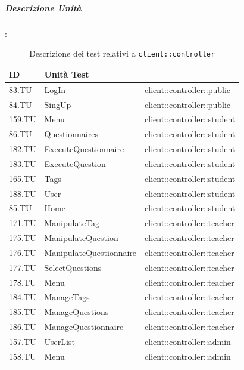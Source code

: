 \documentclass[12pt,a4paper]{article}
\begin{document}
\newpage
\subparagraph{Descrizione Unità}:
\begin{table}[H]
	\begin{center}
		\begin{tabular}{p{} p{} p{}}
			\toprule
			\textbf{ID}   & \textbf{Unità Test}	& \textbf{\mgls{package}} \\ \midrule
			\midrule
			83.TU & LogIn & client::controller::public\\ \midrule
			84.TU & SingUp & client::controller::public\\ \midrule
			159.TU & Menu & client::controller::student\\ \midrule
			86.TU & Questionnaires & client::controller::student\\ \midrule
			182.TU & ExecuteQuestionnaire & client::controller::student\\ \midrule
			183.TU & ExecuteQuestion & client::controller::student\\ \midrule
			165.TU & Tags & client::controller::student\\ \midrule
			188.TU & User & client::controller::student\\ \midrule
			85.TU & Home & client::controller::student\\ \midrule
			171.TU & ManipulateTag & client::controller::teacher\\ \midrule
			175.TU & ManipulateQuestion & client::controller::teacher\\ \midrule
			176.TU & ManipulateQuestionnaire & client::controller::teacher\\ \midrule
			177.TU & SelectQuestions & client::controller::teacher\\ \midrule
			178.TU & Menu & client::controller::teacher\\ \midrule
			184.TU & ManageTags & client::controller::teacher\\ \midrule
			185.TU & ManageQuestions & client::controller::teacher\\ \midrule
			186.TU & ManageQuestionnaire & client::controller::teacher\\ \midrule
			157.TU & UserList & client::controller::admin\\ \midrule
			158.TU & Menu & client::controller::admin\\ \midrule			
		 \bottomrule
		\end{tabular}
	\end{center}
	\caption{Descrizione dei test relativi a \texttt{client::controller}}
\end{table}
\end{document}
